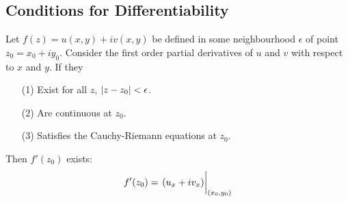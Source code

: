 \documentclass[12pt, english]{book}
\begin{document}
	\subsection{Conditions for Differentiability}
	\label{Conditions for Differentiablity Subsection - Complex}
	
	\begin{theorem}
		\label{Cauchy-Riemann Differentiablity Conditions Theorem - Complex}
		Let \(f(z) = u(x,y) + iv(x,y)\) be defined in some neighbourhood \(\epsilon\) of point \(z_0 = x_0 + iy_0\). Consider the first order partial derivatives of \(u\) and \(v\) with respect to \(x\) and \(y\). If they 
		\begin{itemize}
			\item[(1)] Exist for all \(z\), \(\abs{z-z_0}<\epsilon\).
			\item[(2)] Are continuous at \(z_0\).
			\item[(3)] Satisfies the Cauchy-Riemann equations at \(z_0\).
		\end{itemize}
		Then \(f'(z_0)\) exists:
		\[f'(z_0) = \eval{(u_x + iv_x)}_{(x_0, y_0)}\]
	\end{theorem}
\end{document}
